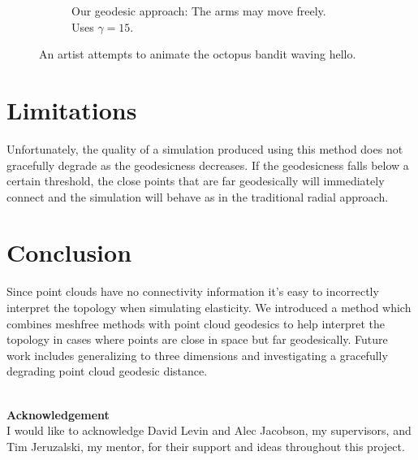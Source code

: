 \documentclass[11pt,a4paper, final, twoside]{article}
\theoremstyle{proposition}
\theoremstyle{definition}
\theoremstyle{remark}
\numberwithin{equation}{section}
\begin{document}
\begin{figure}[h]
\begin{subfigure}[t]{.5\textwidth}
  \caption{Our geodesic approach: The arms may move freely. Uses $\gamma = 15$.}
\end{subfigure}
\caption{An artist attempts to animate the octopus bandit waving hello.}
\label{fig:octopusBandit}
\end{figure}



\section{Limitations}

Unfortunately, the quality of a simulation produced using this method does not gracefully degrade as the geodesicness decreases. If the geodesicness falls below a certain threshold, the close points that are far geodesically will immediately connect and the simulation will behave as in the traditional radial approach.

\section{Conclusion}
Since point clouds have no connectivity information it's easy to incorrectly interpret the topology when simulating elasticity. We introduced a method which combines meshfree methods with point cloud geodesics to help interpret the topology in cases where points are close in space but far geodesically. Future work includes generalizing to three dimensions and investigating a gracefully degrading point cloud geodesic distance.

\mbox{}\\

\noindent \Large\textbf{Acknowledgement}\\[1mm]
\normalsize \noindent I would like to acknowledge David Levin and Alec Jacobson, my supervisors, and Tim Jeruzalski, my mentor, for their support and ideas throughout this project.\\[3mm]



\end{document}
